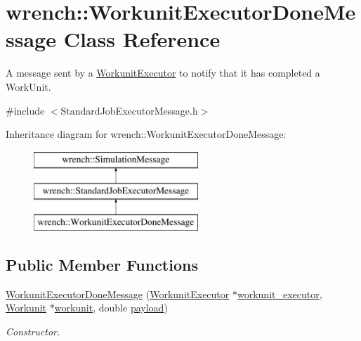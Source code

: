 \hypertarget{classwrench_1_1_workunit_executor_done_message}{}\section{wrench\+:\+:Workunit\+Executor\+Done\+Message Class Reference}
\label{classwrench_1_1_workunit_executor_done_message}


A message sent by a \hyperlink{classwrench_1_1_workunit_executor}{Workunit\+Executor} to notify that it has completed a Work\+Unit.  




{\ttfamily \#include $<$Standard\+Job\+Executor\+Message.\+h$>$}

Inheritance diagram for wrench\+:\+:Workunit\+Executor\+Done\+Message\+:\begin{figure}[H]
\begin{center}
\leavevmode
\includegraphics[height=3.000000cm]{classwrench_1_1_workunit_executor_done_message}
\end{center}
\end{figure}
\subsection*{Public Member Functions}
\begin{DoxyCompactItemize}
\item 
\hyperlink{classwrench_1_1_workunit_executor_done_message_a6b9036befd5f8b778cea00346578b9d8}{Workunit\+Executor\+Done\+Message} (\hyperlink{classwrench_1_1_workunit_executor}{Workunit\+Executor} $\ast$\hyperlink{classwrench_1_1_workunit_executor_done_message_a678e7d9f87b7cf1318e28f1895251b2d}{workunit\+\_\+executor}, \hyperlink{classwrench_1_1_workunit}{Workunit} $\ast$\hyperlink{classwrench_1_1_workunit_executor_done_message_aa008db4525787c0269069558180b6a87}{workunit}, double \hyperlink{classwrench_1_1_simulation_message_a914f2732713f7c02898e66f05a7cb8a1}{payload})
\begin{DoxyCompactList}\small\item\em Constructor. \end{DoxyCompactList}\end{DoxyCompactItemize}
